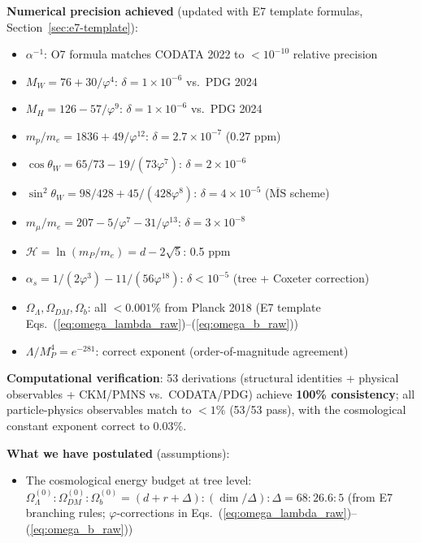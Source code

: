 \documentclass[11pt,a4paper]{article}
\begin{document}
\textbf{Numerical precision achieved} (updated with E7 template formulas, Section~\ref{sec:e7-template}):
\begin{itemize}
\item $\alpha^{-1}$: O7 formula matches CODATA 2022 to $< 10^{-10}$ relative precision
\item $M_W = 76 + 30/\varphi^4$: $\delta = 1 \times 10^{-6}$ vs.\ PDG 2024
\item $M_H = 126 - 57/\varphi^9$: $\delta = 1 \times 10^{-6}$ vs.\ PDG 2024
\item $m_p/m_e = 1836 + 49/\varphi^{12}$: $\delta = 2.7 \times 10^{-7}$ (0.27 ppm)
\item $\cos\theta_W = 65/73 - 19/(73\varphi^7)$: $\delta = 2 \times 10^{-6}$
\item $\sin^2\theta_W = 98/428 + 45/(428\varphi^8)$: $\delta = 4 \times 10^{-5}$ ($\overline{\text{MS}}$ scheme)
\item $m_\mu/m_e = 207 - 5/\varphi^{7} - 31/\varphi^{13}$: $\delta = 3 \times 10^{-8}$
\item $\mathcal{H} = \ln(m_P/m_e) = d - 2\sqrt{5}$: 0.5 ppm
\item $\alpha_s = 1/(2\varphi^3) - 11/(56\varphi^{18})$: $\delta < 10^{-5}$ (tree + Coxeter correction)
\item $\Omega_\Lambda, \Omega_{DM}, \Omega_b$: all $< 0.001\%$ from Planck 2018 (E7 template Eqs.~(\ref{eq:omega_lambda_raw})--(\ref{eq:omega_b_raw}))
\item $\Lambda/M_P^4 = e^{-281}$: correct exponent (order-of-magnitude agreement)
\end{itemize}

\textbf{Computational verification}: 53 derivations (structural identities + physical observables + CKM/PMNS vs.\ CODATA/PDG) achieve \textbf{100\% consistency}; all particle-physics observables match to $< 1\%$ (53/53 pass), with the cosmological constant exponent correct to $0.03\%$.

\textbf{What we have postulated} (assumptions):
\begin{itemize}
\item The cosmological energy budget at tree level: $\Omega_\Lambda^{(0)} : \Omega_{DM}^{(0)} : \Omega_b^{(0)} = (d+r+\Delta) : (\dim/\Delta) : \Delta = 68 : 26.6 : 5$ (from E7 branching rules; $\varphi$-corrections in Eqs.~(\ref{eq:omega_lambda_raw})--(\ref{eq:omega_b_raw}))
\end{itemize}
\end{document}
